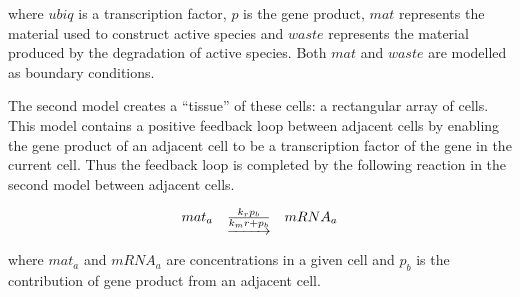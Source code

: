 \documentclass{cekarticle}
\begin{document}
where $ubiq$ is a transcription factor, $p$ is the gene product,
$mat$ represents the material used to construct active species and
$waste$ represents the material produced by the degradation of
active species.  Both $mat$ and $waste$ are modelled as boundary
conditions.

The second model creates a ``tissue'' of these cells: a rectangular array of cells. This
model contains a positive feedback loop between adjacent cells by
enabling the gene product of an adjacent cell to be a
transcription factor of the gene in the current cell. Thus the
feedback loop is completed by the following reaction in the second model
between adjacent cells. 

\begin{equation*}
  \begin{array}{@{}ccc@{}}
    mat_a & \underrightarrow{\frac{k_r p_b}{k_mr + p_b}} & mRNA_a
  \end{array}
\end{equation*}

where $mat_a$ and $mRNA_a$ are concentrations in a given cell and
$p_b$ is the contribution of gene product from an adjacent cell.
\end{document}
